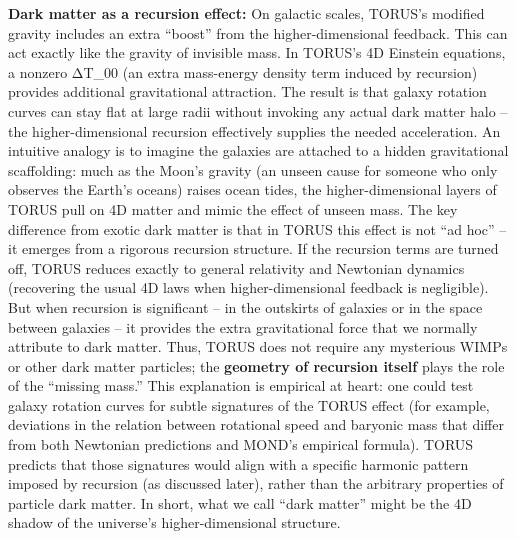 \documentclass[
]{article}
\begin{document}
{\textbf{Dark matter as a recursion effect:} On galactic scales, TORUS's
modified gravity includes an extra ``boost'' from the higher-dimensional
feedback. This can act exactly like the gravity of invisible mass. In
TORUS's 4D Einstein equations, a nonzero
ΔT_{00}{} (an extra
mass-energy density term induced by recursion) provides additional
gravitational attraction\hspace{0pt}. The result is that galaxy rotation
curves can stay flat at large radii without invoking any actual dark
matter halo -- the higher-dimensional recursion effectively supplies the
needed acceleration\hspace{0pt}. An intuitive analogy is to imagine the
galaxies are attached to a hidden gravitational scaffolding: much as the
Moon's gravity (an unseen cause for someone who only observes the
Earth's oceans) raises ocean tides, the higher-dimensional layers of
TORUS pull on 4D matter and mimic the effect of unseen mass. The key
difference from exotic dark matter is that in TORUS this effect is not
``ad hoc'' -- it emerges from a rigorous recursion structure. If the
recursion terms are turned off, TORUS reduces exactly to general
relativity and Newtonian dynamics (recovering the usual 4D laws when
higher-dimensional feedback is negligible)\hspace{0pt}. But when
recursion is significant -- in the outskirts of galaxies or in the space
between galaxies -- it provides the extra gravitational force that we
normally attribute to dark matter. Thus, TORUS does not require any
mysterious WIMPs or other dark matter particles; the \textbf{geometry of
recursion itself} plays the role of the ``missing mass.'' This
explanation is empirical at heart: one could test galaxy rotation curves
for subtle signatures of the TORUS effect (for example, deviations in
the relation between rotational speed and baryonic mass that differ from
both Newtonian predictions and MOND's empirical formula)\hspace{0pt}.
TORUS predicts that those signatures would align with a specific
harmonic pattern imposed by recursion (as discussed later), rather than
the arbitrary properties of particle dark matter. In short, what we call
``dark matter'' might be the 4D shadow of the universe's
higher-dimensional structure.

}
\end{document}
